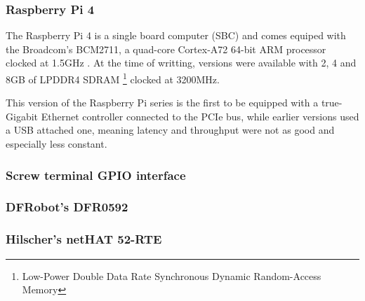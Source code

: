 \subsubsection{Raspberry Pi 4}
The Raspberry Pi 4 is a single board computer (SBC) and comes equiped with the Broadcom's BCM2711, a quad-core Cortex-A72 64-bit ARM processor clocked at 1.5GHz \cite{technology:rpi4-specs}.
At the time of writting, versions were available with 2, 4 and 8GB of LPDDR4 SDRAM \footnote{Low-Power Double Data Rate Synchronous Dynamic Random-Access Memory} clocked at 3200MHz.

This version of the Raspberry Pi series is the first to be equipped with a true-Gigabit Ethernet controller connected to the PCIe bus, while earlier versions used a USB attached one, meaning latency and throughput were not as good and especially less constant.

\subsubsection{Screw terminal GPIO interface}


\subsubsection{DFRobot's DFR0592}


\subsubsection{Hilscher's netHAT 52-RTE}

